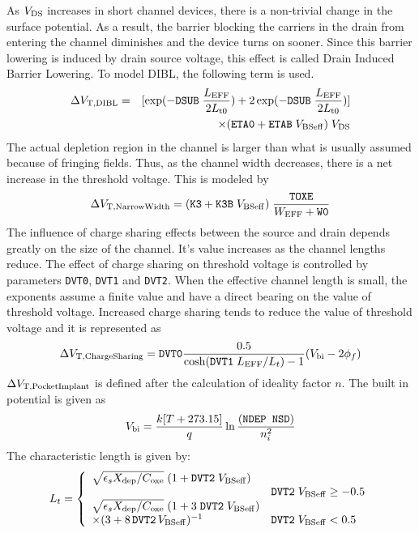 \documentclass{article}
\begin{document}
\noindent As $V_{\rm{DS}}$ increases in short channel devices,
there is a non-trivial change in the surface potential. As a
result, the barrier blocking the carriers in the drain from
entering the channel diminishes and the device turns on sooner.
Since this barrier lowering is induced by drain source voltage,
this effect is called Drain Induced Barrier Lowering. To model
DIBL, the following term is used.
\begin{eqnarray}
\Delta V_{\rm{T,DIBL}} & = & [\exp(-\texttt{DSUB}\; {L_{\rm{EFF}}
\over 2 L_{\rm{t0}}}) + 2 \exp(-\texttt{DSUB} \;{L_{\rm{EFF}}
\over 2 L_{\rm{t0}}})]
\nonumber \\
& & \times (\texttt{ETA0} + \texttt{ETAB} \; V_{\rm{BSeff}}) \;
V_{\rm{DS}}
\end{eqnarray}
\noindent The actual depletion region in the channel is larger
than what is usually assumed because of fringing fields. Thus, as
the channel width decreases, there is a net increase in the
threshold voltage. This is modeled by
\begin{equation}
\Delta V_{\rm{T,NarrowWidth}} = (\texttt{K3} + \texttt{K3B} \;
V_{\rm{BSeff}})\; {\texttt{TOXE} \over W_{\rm{EFF}} + \texttt{W0}}
\end{equation}
\noindent The influence of charge sharing effects between the
source and drain depends greatly on the size of the channel. It's
value increases as the channel lengths reduce. The effect of
charge sharing on threshold voltage is controlled by parameters
\texttt{DVT0}, \texttt{DVT1} and \texttt{DVT2}. When the effective
channel length is small, the exponents assume a finite value and
have a direct bearing on the value of threshold voltage. Increased
charge sharing  tends to reduce the value of threshold voltage and
it is represented as
\begin{equation}
\Delta V_{\rm{T,ChargeSharing}} = \texttt{DVT0} {0.5 \over
\cosh(\texttt{DVT1} \; L_{\rm{EFF}}/L_t) - 1 }(V_{\rm{bi}} - 2
\phi_f)
\end{equation}
$\Delta V_{\rm{T,PocketImplant}}$ is defined after the calculation
of ideality factor $n$. The built in potential is given as
\begin{equation}
V_{\rm{bi}} = {k [T + 273.15] \over q} \ln{(\texttt{NDEP NSD})
\over n_i^2}
\end{equation}
\noindent The characteristic length is given by:
\begin{equation}
L_t = \left\{\begin{array}{ll}
       {\sqrt{\epsilon_s X_{\rm{dep}} / C_{\rm{oxe}}}}\;(1 + \texttt{DVT2}\;V_{\rm{BSeff}}) & \\
                  & \texttt{DVT2}\;V_{\rm{BSeff}} \geq -0.5\\
       {\sqrt{\epsilon_s X_{\rm{dep}} / C_{\rm{oxe}}}}\;(1 + 3\;\texttt{DVT2}\;V_{\rm{BSeff}})  & \\
     \times (3 + 8\,\texttt{DVT2}\,V_{\rm{BSeff}})^{-1} & \texttt{DVT2}\;V_{\rm{BSeff}} <0.5
              \end{array}
                    \right.
\end{equation}
\end{document}
